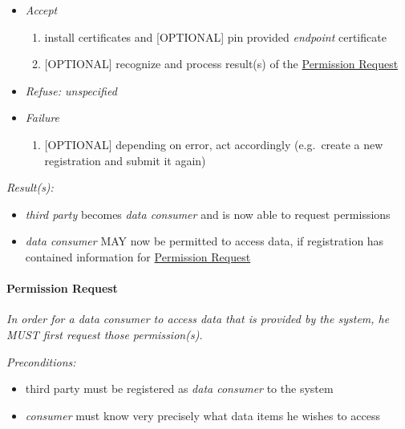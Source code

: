 \documentclass[12pt,english,a4paper,titlepage,cleardoublepage=empty,dottedtoc]{report}
\providecommand{\tightlist}{%
  \setlength{\itemsep}{0pt}\setlength{\parskip}{0pt}}
\begin{document}
\begin{enumerate}
  \begin{itemize}
  \item
    \emph{Accept}

    \begin{enumerate}
    \def\labelenumii{\arabic{enumii})}
    \tightlist
    \item
      install certificates and {[}OPTIONAL{]} pin provided
      \emph{endpoint} certificate
    \item
      {[}OPTIONAL{]} recognize and process result(s) of the
      \protect\hyperlink{-permission-request}{Permission Request}
    \end{enumerate}
  \item
    \emph{Refuse: unspecified}
  \item
    \emph{Failure}

    \begin{enumerate}
    \def\labelenumii{\arabic{enumii})}
    \tightlist
    \item
      {[}OPTIONAL{]} depending on error, act accordingly (e.g.~create a
      new registration and submit it again)
    \end{enumerate}
  \end{itemize}
\end{enumerate}

\emph{Result(s):}

\begin{itemize}
\tightlist
\item
  \emph{third party} becomes \emph{data consumer} and is now able to
  request permissions
\item
  \emph{data consumer} MAY now be permitted to access data, if
  registration has contained information for
  \protect\hyperlink{-permission-request}{Permission Request}
\end{itemize}

\hypertarget{permission-request}{\paragraph{Permission
Request}\label{permission-request}}

\emph{In order for a data consumer to access data that is provided by
the system, he MUST first request those permission(s).}

\emph{Preconditions:}

\begin{itemize}
\tightlist
\item
  third party must be registered as \emph{data consumer} to the system
\item
  \emph{consumer} must know very precisely what data items he wishes to
  access
\end{itemize}
\end{document}
